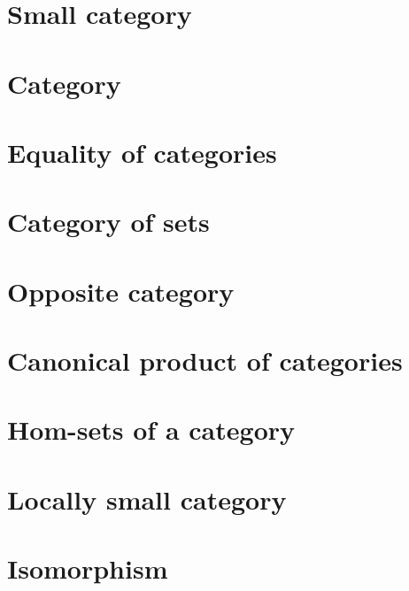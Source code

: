 \section{Small category}
    
\section{Category}
    
\section{Equality of categories}\label{section:cat:equal}
    
\section{Category of sets}
    
\section{Opposite category}
    
\section{Canonical product of categories}
    
\section{Hom-sets of a category}
    
\section{Locally small category}
    
\section{Isomorphism}
    
